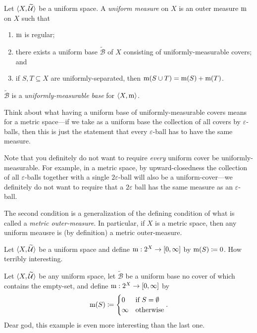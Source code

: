 \begin{dfn}\label{UniformMeasure}
Let $\langle X,\widetilde{\mathcal{U}}\rangle$ be a uniform space.  A \emph{uniform measure} on $X$ is an outer measure $\mathrm{m}$ on $X$ such that
\begin{enumerate}
\item $\mathrm{m}$ is regular;
\item \label{UniformMeasure.i}there exists a uniform base $\widetilde{\mathcal{B}}$ of $X$ consisting of uniformly-measurable covers; and
\item \label{UniformMeasure.ii}if $S,T\subseteq X$ are uniformly-separated, then $\mathrm{m} (S\cup T)=\mathrm{m} (S)+\mathrm{m} (T)$.
\end{enumerate}
\begin{rmk}
$\widetilde{\mathcal{B}}$ is a \emph{uniformly-measurable base} for $\langle X,\mathrm{m}\rangle$.
\end{rmk}
\begin{rmk}
Think about what having a uniform base of uniformly-measurable covers means for a metric space---if we take as a uniform base the collection of all covers by $\varepsilon$-balls, then this is just the statement that every $\varepsilon$-ball has to have the same measure.
\end{rmk}
\begin{rmk}
Note that you definitely do not want to require \emph{every} uniform cover be uniformly-measurable.  For example, in a metric space, by upward-closedness the collection of all $\varepsilon$-balls together with a single $2\varepsilon$-ball will also be a uniform-cover---we definitely do not want to require that a $2\varepsilon$ ball has the same measure as an $\varepsilon$-ball.
\end{rmk}
\begin{rmk}
The second condition is a generalization of the defining condition of what is called a \emph{metric outer-measure}.  In particular, if $X$ is a metric space, then any uniform meausre is (by definition) a metric outer-measure.
\end{rmk}
\end{dfn}
\begin{exm}
Let $\langle X,\widetilde{\mathcal{U}}\rangle$ be a uniform space and define $\mathrm{m} :2^X\rightarrow [0,\infty ]$ by $\mathrm{m} (S)\coloneqq 0$.  How terribly interesting.
\end{exm}
\begin{exm}
Let $\langle X,\widetilde{\mathcal{U}}\rangle$ be any uniform space, let $\widetilde{\mathcal{B}}$ be a uniform base no cover of which contains the empty-set, and define $\mathrm{m} :2^X\rightarrow [0,\infty ]$ by
\begin{equation}
\mathrm{m} (S)\coloneqq \begin{cases}0 & \text{if }S=\emptyset \\ \infty & \text{otherwise}\end{cases}.
\end{equation}
Dear god, this example is even more interesting than the last one.
\end{exm}
